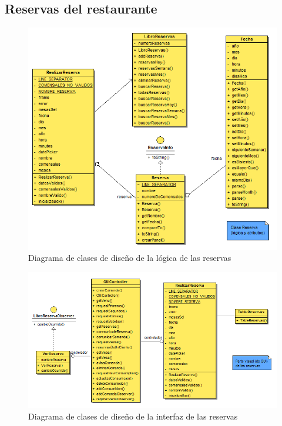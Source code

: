 \documentclass[spanish,a4paper,11pt, twoside]{report}	%
\begin{document}
		\subsection{Reservas del restaurante}
		\begin{figure}[!h]
		\centering
		\includegraphics[scale=0.5]{DCDreservas.png}
		\caption{Diagrama de clases de diseño de la lógica de las reservas}
		\end{figure}

		\begin{figure}[!h]
		\centering
		\includegraphics[scale=0.5]{DCDvistareservas.png}
		\caption{Diagrama de clases de diseño de la interfaz de las reservas}
		\end{figure}
\end{document}
